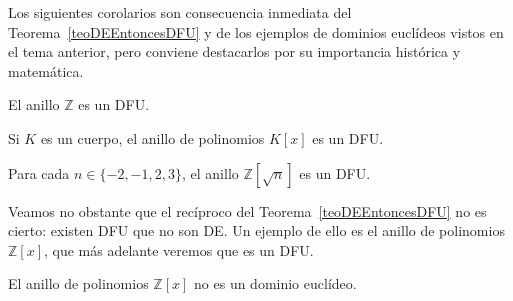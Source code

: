 Los siguientes corolarios son consecuencia inmediata del Teorema~\ref{teoDEEntoncesDFU} y de los ejemplos de dominios euclídeos vistos en el tema anterior, pero conviene destacarlos por su importancia histórica y matemática.

\begin{coro}
    El anillo $\mathbb{Z}$ es un DFU.
\end{coro}

\begin{coro}
    Si $K$ es un cuerpo, el anillo de polinomios $K[x]$ es un DFU.
\end{coro}

\begin{coro}
    Para cada $n \in \{-2, -1, 2, 3\}$, el anillo $\mathbb{Z}[\sqrt{n}]$ es un DFU.
\end{coro}


Veamos no obstante que el recíproco del Teorema~\ref{teoDEEntoncesDFU} no es cierto: existen DFU que no son DE. Un ejemplo de ello es el anillo de polinomios $\mathbb{Z}[x]$, que más adelante veremos que es un DFU.
\begin{prop}
    El anillo de polinomios $\mathbb{Z}[x]$ no es un dominio euclídeo.
\end{prop}


